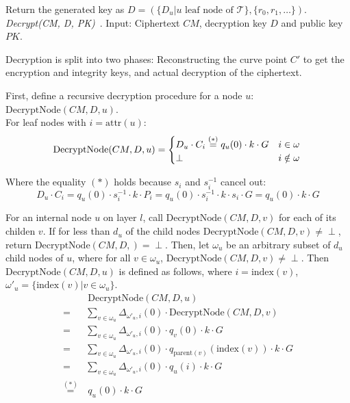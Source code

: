 Return the generated key as $D = (\{D_u | u \text{ leaf node of } \mathcal{T}\}, \{r_0, r_1, \dots \})$.
\\

\noindent \emph{Decrypt(CM, D, PK)}~\cite{yao_lightweight_2015}. Input: Ciphertext $CM$, decryption key $D$ and public key $PK$.

Decryption is split into two phases: Reconstructing the curve point $C'$ to get the encryption and integrity keys, and actual decryption of the ciphertext.

First, define a recursive decryption procedure for a node $u$: $\text{DecryptNode}(CM, D, u)$. \\
For leaf nodes with $i = \text{attr}(u)$:
\begin{equation*}
    \text{DecryptNode}(CM, D, u) = \begin{cases}
        D_u \cdot C_i \stackrel{(*)}{=} q_u(0) \cdot k \cdot G & i \in \omega\\
        \perp & i \notin \omega
    \end{cases}\\
\end{equation*}

Where the equality $(*)$ holds because $s_i$ and $s_i^{-1}$ cancel out: 
\begin{equation*}
    D_u \cdot C_i = q_u(0) \cdot s_i^{-1} \cdot k \cdot P_i = q_u(0) \cdot s_i^{-1} \cdot k \cdot s_i \cdot G = q_u(0) \cdot k \cdot G
\end{equation*}

For an internal node $u$ on layer $l$, call $\text{DecryptNode}(CM, D, v)$ for each of its childen $v$. If for less than $d_u$ of the child nodes $\text{DecryptNode}(CM, D, v) \neq \perp$, return $\text{DecryptNode}(CM, D, )=\perp$.
Then, let $\omega_u$ be an arbitrary subset of $d_u$ child nodes of $u$, where for all $v \in \omega_u$, $\text{DecryptNode}(CM, D, v) \neq \perp$.
Then $\text{DecryptNode}(CM, D, u)$ is defined as follows, where $i = \text{index}(v)$, $\omega'_u = \{\text{index}(v) | v \in \omega_u\}$.
\begin{equation*}
    \begin{split}
        &~\text{DecryptNode}(CM, D, u)\\
        =& \sum_{v \in \omega_u} \Delta_{\omega'_u, i}(0) \cdot \text{DecryptNode}(CM, D, v)\\
        =& \sum_{v \in \omega_u} \Delta_{\omega'_u, i}(0) \cdot q_v(0) \cdot k \cdot G\\
        =& \sum_{v \in \omega_u} \Delta_{\omega'_u, i}(0) \cdot q_{\text{parent}(v)}(\text{index}(v)) \cdot k \cdot G\\
        =& \sum_{v \in \omega_u} \Delta_{\omega'_u, i}(0) \cdot q_u(i) \cdot k \cdot G\\
        \stackrel{(*)}{=}&~q_u(0) \cdot k \cdot G
    \end{split}
\end{equation*}

